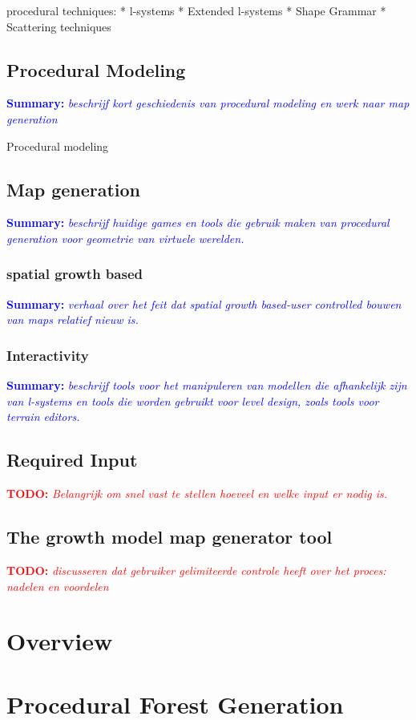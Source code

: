 \documentclass{article}
\newcommand{\todo}[1]{\textcolor{red}{\textbf{\newline TODO: }\it{#1} \newline}}
\newcommand{\inhoud}[1]{\textcolor{blue}{\textbf{\newline Summary: }\it{#1}}}
\begin{document}
procedural techniques: 
* l-systems
* Extended l-systems
* Shape Grammar
* Scattering techniques

\subsection{Procedural Modeling}
\inhoud{beschrijf kort geschiedenis van procedural modeling en werk naar map generation}

Procedural modeling                        


\subsection{Map generation}
\inhoud{beschrijf huidige games en tools die gebruik maken van procedural generation voor geometrie van virtuele werelden.}

\subsubsection{spatial growth based}
\inhoud{verhaal over het feit dat spatial growth based-user controlled bouwen van maps relatief nieuw is.}

\subsubsection{Interactivity}
\inhoud{beschrijf tools voor het manipuleren van modellen die afhankelijk zijn van l-systems en tools die worden 
	gebruikt voor level design, zoals tools voor terrain editors.}


\subsection{Required Input}
\todo{Belangrijk om snel vast te stellen hoeveel en welke input er nodig is.}


\subsection{The growth model map generator tool}
\todo{discusseren dat gebruiker gelimiteerde controle heeft over het proces: nadelen en voordelen}
   
\section{Overview}

\section{Procedural Forest Generation}
\end{document}
